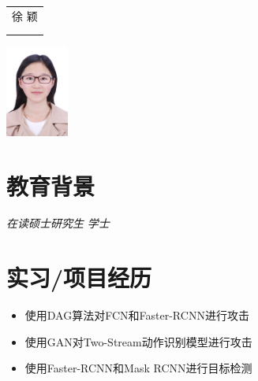 \documentclass{resume}
\begin{document}

\medskip\noindent
\begin{minipage}{0.7\textwidth}
  \Large{
    \begin{tabu}  { l }
      \scshape{徐 \quad  颖} \\
       \\
       \\
    \end{tabu}
  }
\end{minipage}
\begin{minipage}{0.3\textwidth}
  \raggedleft
  \includegraphics[height=30mm]{xy}
\end{minipage}



\section{  教育背景}
\textit{在读硕士研究生}
\textit{学士}

\section{ 实习/项目经历}

\begin{itemize}[topsep = 0 pt, partopsep = 0pt]
  \item 使用DAG算法对FCN和Faster-RCNN进行攻击
  \item 使用GAN对Two-Stream动作识别模型进行攻击
\end{itemize}


\begin{itemize}[topsep = 0 pt, partopsep = 0pt]
  \item 使用Faster-RCNN和Mask RCNN进行目标检测
\end{itemize}
\end{document}
